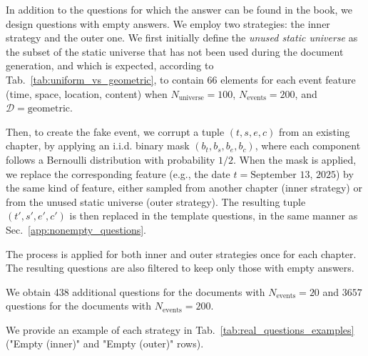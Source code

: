 \documentclass{article}
\begin{document}
In addition to the questions for which the answer can be found in the book, we design questions with empty answers.
We employ two strategies: the inner strategy and the outer one. 
We first initially define the \emph{unused static universe} as the subset of the static universe that has not been used during the document generation, and which is expected, according to Tab.~\ref{tab:uniform_vs_geometric}, to contain $66$ elements for each event feature (time, space, location, content) when $N_\text{universe} = 100$, $N_\text{events} = 200$, and $\mathcal{D}=\text{geometric}$.

Then, to create the fake event, we corrupt a tuple $(t,s,e,c)$ from an existing chapter, by applying an i.i.d. binary mask $(b_t, b_s, b_e, b_c)$, where each component follows a Bernoulli distribution with probability $1/2$. When the mask is applied, we replace the corresponding feature (e.g., the date $t = \text{September 13, 2025}$) by the same kind of feature, either sampled from another chapter (inner strategy) or from the unused static universe (outer strategy). The resulting tuple $(t',s',e',c')$ is then replaced in the template questions, in the same manner as Sec.~\ref{app:nonempty_questions}.

The process is applied for both inner and outer strategies once for each chapter. The resulting questions are also filtered to keep only those with empty answers.

We obtain 438 additional questions for the documents with $N_{\text{events}} = 20$ and $3657$ questions for the documents with $N_{\text{events}} = 200$.

We provide an example of each strategy in Tab.~\ref{tab:real_questions_examples} ("Empty (inner)" and "Empty (outer)" rows).


\clearpage
\end{document}
